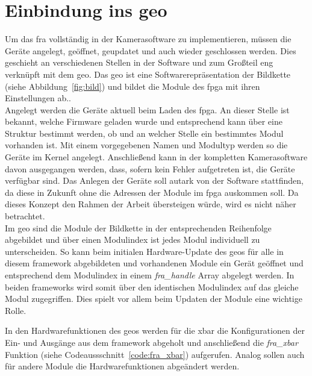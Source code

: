\section{Einbindung ins \acl{geo}}\label{sec:soft}
Um das \ac{fra} vollständig in der Kamerasoftware zu implementieren, müssen die Geräte angelegt, geöffnet, geupdatet und auch wieder geschlossen werden. Dies geschieht an verschiedenen Stellen in der Software und zum Großteil eng verknüpft mit dem \ac{geo}. Das \ac{geo} ist eine Softwarerepräsentation der Bildkette (siehe Abbildung~\ref{fig:bild}) und bildet die Module des \ac{fpga} mit ihren Einstellungen ab..\\


Angelegt werden die Geräte aktuell beim Laden des \ac{fpga}. An dieser Stelle ist bekannt, welche Firmware geladen wurde und entsprechend kann über eine Struktur bestimmt werden, ob und an welcher Stelle ein bestimmtes Modul vorhanden ist. Mit einem vorgegebenen Namen und Modultyp werden so die Geräte im Kernel angelegt. Anschließend kann in der kompletten Kamerasoftware davon ausgegangen werden, dass, sofern kein Fehler aufgetreten ist, die Geräte verfügbar sind. Das Anlegen der Geräte soll autark von der Software stattfinden, da diese in Zukunft ohne die Adressen der Module im \ac{fpga} auskommen soll. Da dieses Konzept den Rahmen der Arbeit übersteigen würde, wird es nicht näher betrachtet. \\

Im \ac{geo} sind die Module der Bildkette in der entsprechenden Reihenfolge abgebildet und über einen Modulindex ist jedes Modul individuell zu unterscheiden. So kann beim initialen Hardware-Update des \ac{geo}s für alle in diesem \gls{framework} abgebildeten und vorhandenen Module ein Gerät geöffnet und entsprechend dem Modulindex in einem \textit{fra\_handle} Array abgelegt werden. In beiden \glspl{framework} wird somit über den identischen Modulindex auf das gleiche Modul zugegriffen. Dies spielt vor allem beim Updaten der Module eine wichtige Rolle.


In den Hardwarefunktionen des \ac{geo}s werden für die \ac{xbar} die Konfigurationen der Ein- und Ausgänge aus dem \gls{framework} abgeholt und anschließend die \textit{fra\_xbar} Funktion (siehe Codeaussschnitt~\ref{code:fra_xbar}) aufgerufen. Analog sollen auch für andere Module die Hardwarefunktionen abgeändert werden.








